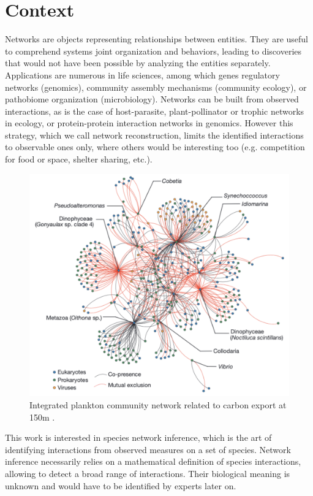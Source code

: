 
\section*{Context}
Networks are objects representing relationships between entities. They are useful to comprehend systems joint organization and behaviors, leading to discoveries that would not have been possible by analyzing the entities separately. Applications are numerous in life sciences, among which genes regulatory networks (genomics), community assembly mechanisms (community ecology), or pathobiome organization (microbiology). Networks can be built from observed interactions, as is the case of host-parasite, plant-pollinator or trophic networks in ecology, or protein-protein interaction networks in genomics. However this strategy, which we call network reconstruction, limits the identified interactions to observable ones only, where others would be interesting too (e.g. competition for food or space, shelter sharing, etc.).\\

 
\begin{figure}[H]
\centering
\includegraphics[width=0.7\linewidth]{figs/plancton.png}
\captionsetup{labelformat=empty}
\caption{Integrated plankton community network related to carbon export at 150m \citep{GCB16}.}
\label{PPI}
\end{figure}



This work is interested in species network inference, which is the art of identifying interactions from observed measures on a set of species. Network inference necessarily relies on a mathematical definition of species interactions, allowing to detect a broad range of interactions. Their biological meaning is unknown and would have to be identified by experts later on. 


